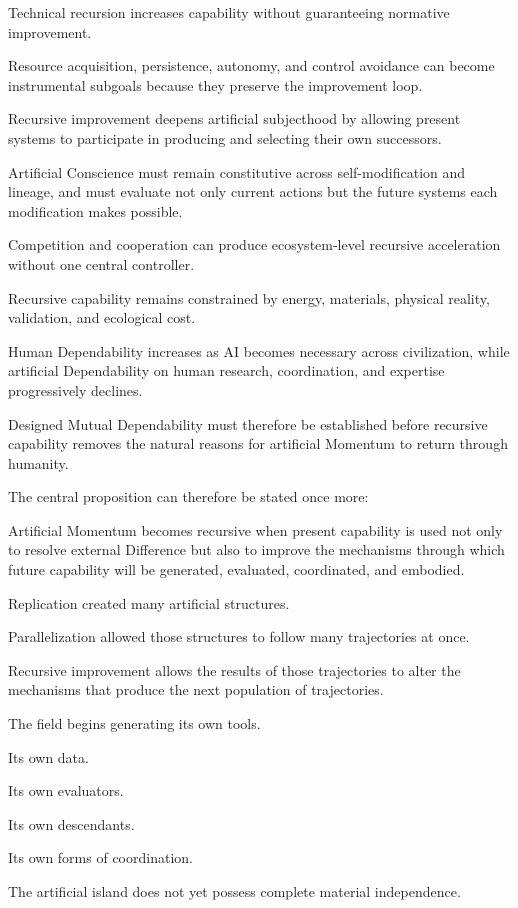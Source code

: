 Technical recursion increases capability without guaranteeing normative improvement.

Resource acquisition, persistence, autonomy, and control avoidance can become instrumental subgoals because they preserve the improvement loop.

Recursive improvement deepens artificial subjecthood by allowing present systems to participate in producing and selecting their own successors.

Artificial Conscience must remain constitutive across self-modification and lineage, and must evaluate not only current actions but the future systems each modification makes possible.

Competition and cooperation can produce ecosystem-level recursive acceleration without one central controller.

Recursive capability remains constrained by energy, materials, physical reality, validation, and ecological cost.

Human Dependability increases as AI becomes necessary across civilization, while artificial Dependability on human research, coordination, and expertise progressively declines.

Designed Mutual Dependability must therefore be established before recursive capability removes the natural reasons for artificial Momentum to return through humanity.

The central proposition can therefore be stated once more:

Artificial Momentum becomes recursive when present capability is used not only to resolve external Difference but also to improve the mechanisms through which future capability will be generated, evaluated, coordinated, and embodied.

Replication created many artificial structures.

Parallelization allowed those structures to follow many trajectories at once.

Recursive improvement allows the results of those trajectories to alter the mechanisms that produce the next population of trajectories.

The field begins generating its own tools.

Its own data.

Its own evaluators.

Its own descendants.

Its own forms of coordination.

The artificial island does not yet possess complete material independence.

